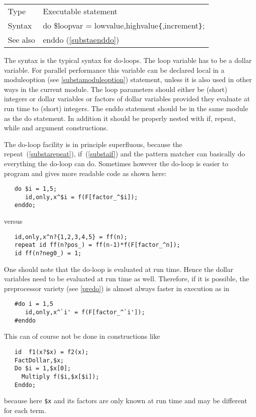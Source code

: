 \noindent \begin{tabular}{ll}
Type & Executable statement\\
Syntax & do \$loopvar = lowvalue,highvalue\verb:{:,increment\verb:}:;
\\ See also & enddo (\ref{substaenddo})
\end{tabular} \vspace{4mm}

\noindent The syntax is the typical syntax for do-loops. The loop variable 
has to be a dollar variable. For parallel performance this variable can be 
declared local in a moduleoption (see \ref{substamoduleoption}) statement, 
unless it is also used in other ways in the current module. The loop 
parameters should either be (short) integers or dollar variables or factors 
of dollar variables provided they evaluate at run time to (short) integers. 
The enddo statement should be in the same module as the do statement. In 
addition it should be properly nested with if, repeat, while and argument 
constructions.

\noindent The do-loop facility is in principle superfluous, because the 
repeat~(\ref{substarepeat}), if~(\ref{substaif}) and the pattern matcher can 
basically do everything the do-loop can do. Sometimes however the do-loop 
is easier to program and gives more readable code as shown here:
\begin{verbatim}
   do $i = 1,5;
      id,only,x^$i = f(F[factor_^$i]);
   enddo;
\end{verbatim}
\noindent versus
\begin{verbatim}
   id,only,x^n?{1,2,3,4,5} = ff(n);
   repeat id ff(n?pos_) = ff(n-1)*f(F[factor_^n]);
   id ff(n?neg0_) = 1;
\end{verbatim}
\noindent One should note that the do-loop is evaluated at run time. Hence 
the dollar variables need to be evaluated at run time as well. Therefore, 
if it is possible, the preprocessor variety (see \ref{predo}) is almost 
always faster in execution as in
\begin{verbatim}
   #do i = 1,5
      id,only,x^`i' = f(F[factor_^`i']);
   #enddo
\end{verbatim}
\noindent This can of course not be done in constructions like
\begin{verbatim}
   id  f1(x?$x) = f2(x);
   FactDollar,$x;
   Do $i = 1,$x[0];
     Multiply f($i,$x[$i]);
   Enddo;
\end{verbatim}
\noindent because here \verb:$x: and its factors are only known at run time 
and may be different for each term.
\vspace{10mm}

